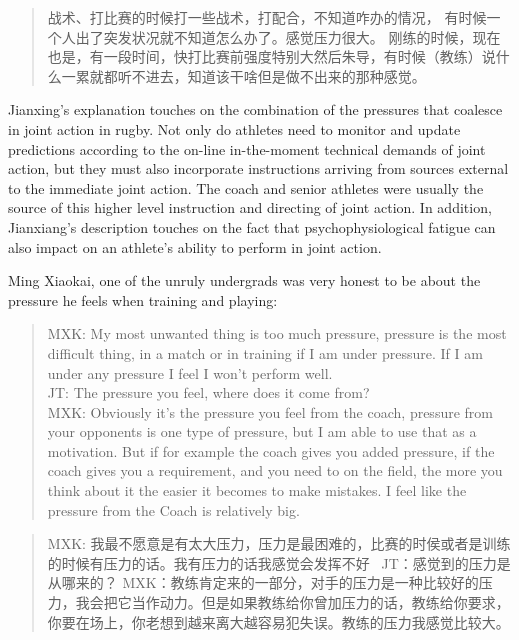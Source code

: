 \begin{CJK}{UTF8}{gbsn}
    \begin{quote}
      战术、打比赛的时候打一些战术，打配合，不知道咋办的情况， 有时候一个人出了突发状况就不知道怎么办了。感觉压力很大。 刚练的时候，现在也是，有一段时间，快打比赛前强度特别大然后朱导，有时候（教练）说什么一累就都听不进去，知道该干啥但是做不出来的那种感觉。
    \end{quote}

Jianxing's explanation touches on the combination of the pressures that coalesce in joint action in rugby.  Not only do athletes need to monitor and update predictions according to the on-line in-the-moment technical demands of joint action, but they must also incorporate instructions arriving from sources external to the immediate joint action.  The coach and senior athletes were usually the source of this higher level instruction and directing of joint action.  In addition, Jianxiang's description touches on the fact that psychophysiological fatigue can also impact on an athlete's ability to perform in joint action.

Ming Xiaokai, one of the unruly undergrads was very honest to be about the pressure he feels when training and playing:

    \begin{quote}
      MXK: My most unwanted thing is too much pressure, pressure is the most difficult thing, in a match or in training if I am under pressure.  If I am under any pressure I feel I won’t perform well. \\
      JT: The pressure you feel, where does it come from? \\
      MXK: Obviously it's the pressure you feel from the coach, pressure from your opponents is one type of pressure, but I am able to use that as a motivation. But if for example the coach gives you added pressure, if the coach gives you a requirement, and you need to on the field, the more you think about it the easier it becomes to make mistakes.  I feel like the pressure from the Coach is relatively big.
    \end{quote}

    \begin{quote}
      MXK: 我最不愿意是有太大压力，压力是最困难的，比赛的时侯或者是训练的时候有压力的话。我有压力的话我感觉会发挥不好 
      JT：感觉到的压力是从哪来的？
      MXK：教练肯定来的一部分，对手的压力是一种比较好的压力，我会把它当作动力。但是如果教练给你曾加压力的话，教练给你要求，你要在场上，你老想到越来离大越容易犯失误。教练的压力我感觉比较大。
    \end{quote}


\end{CJK}
